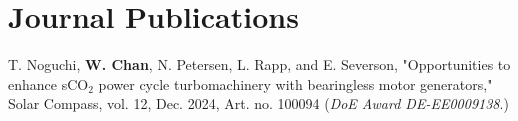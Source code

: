 \section{\sc Journal Publications}

\begin{description}[font=\normalfont, labelwidth=1.5em, leftmargin=2em, itemsep=0.5em]

\item[J1] T. Noguchi, \textbf{W. Chan}, N. Petersen, L. Rapp, and E. Severson, "Opportunities to enhance sCO$_2$ power cycle turbomachinery with bearingless motor generators," Solar Compass, vol. 12, Dec. 2024, Art. no. 100094 (\textit{DoE Award DE-EE0009138}.)

\end{description}

\endinput
